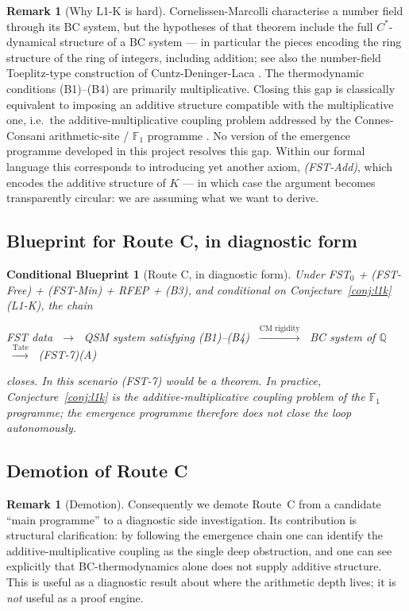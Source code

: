 \documentclass[11pt,a4paper]{article}
\theoremstyle{plain}
\newtheorem{blueprint}[theorem]{Conditional Blueprint}
\theoremstyle{definition}
\newtheorem{remark}[theorem]{Remark}
\newcommand{\Q}{\mathbb{Q}}
\newcommand{\F}{\mathbb{F}}
\begin{document}
\begin{remark}[Why L1-K is hard]\label{rem:l1k-hard}
Cornelissen-Marcolli characterise a number field through its BC
system, but the hypotheses of that theorem include the full
$C^\ast$-dynamical structure of a BC system --- in particular the
pieces encoding the ring structure of the ring of integers,
including addition; see also the number-field Toeplitz-type
construction of Cuntz-Deninger-Laca \cite{CuntzDeningerLaca2013}.
The thermodynamic conditions (B1)--(B4) are
primarily multiplicative.  Closing this gap is classically
equivalent to imposing an additive structure compatible with the
multiplicative one, i.e.\ the additive-multiplicative coupling
problem addressed by the Connes-Consani arithmetic-site / $\F_1$
programme \cite{ConnesMarcolli}.  No version of the emergence programme developed in this
project resolves this gap.  Within our formal language this
corresponds to introducing yet another axiom, \emph{(FST-Add)},
which encodes the additive structure of $K$ --- in which case the
argument becomes transparently circular: we are assuming what we
want to derive.
\end{remark}

\subsection{Blueprint for Route C, in diagnostic form}

\begin{blueprint}[Route C, in diagnostic form]
\label{bp:route-c}
Under FST$_0$ + (FST-Free) + (FST-Min) + RFEP + (B3), \emph{and
conditional on Conjecture~\ref{conj:l1k} (L1-K)}, the chain
\begin{center}
FST data $\;\to\;$ QSM system satisfying (B1)--(B4)
$\;\xrightarrow{\text{CM rigidity}}\;$ BC system of $\Q$
$\;\xrightarrow{\text{Tate}}\;$ (FST-7)(A)
\end{center}
closes.  In this scenario (FST-7) would be a theorem.  In practice,
Conjecture~\ref{conj:l1k} is the additive-multiplicative coupling
problem of the $\F_1$ programme; the emergence programme therefore
does \emph{not} close the loop autonomously.
\end{blueprint}

\subsection{Demotion of Route C}

\begin{remark}[Demotion]
\label{rem:route-c-demotion}
Consequently we demote Route~C from a candidate ``main
programme'' to a diagnostic side investigation.  Its contribution is
structural clarification: by following the emergence chain one can
identify the additive-multiplicative coupling as the single deep
obstruction, and one can see explicitly that BC-thermodynamics
alone does not supply additive structure.  This is useful as a
diagnostic result about where the arithmetic depth lives; it is
\emph{not} useful as a proof engine.
\end{remark}
\end{document}

